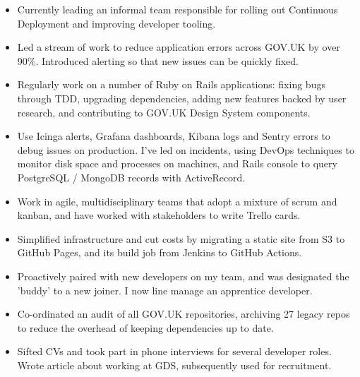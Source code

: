 \documentclass[10pt,a4paper,ragged2e,withhyper]{altacv}
\begin{document}
\begin{paracol}{2}



\begin{itemize}
    \item Currently leading an informal team responsible for rolling out Continuous Deployment and improving developer tooling.
\end{itemize}

\divider

\begin{itemize}
    \item Led a stream of work to reduce application errors across GOV.UK by over 90\%. Introduced alerting so that new issues can be quickly fixed.
    \item Regularly work on a number of Ruby on Rails applications: fixing bugs through TDD, upgrading dependencies, adding new features backed by user research, and contributing to GOV.UK Design System components.
    \item Use Icinga alerts, Grafana dashboards, Kibana logs and Sentry errors to debug issues on production. I've led on incidents, using DevOps techniques to monitor disk space and processes on machines, and Rails console to query PostgreSQL / MongoDB records with ActiveRecord.
    \item Work in agile, multidisciplinary teams that adopt a mixture of scrum and kanban, and have worked with stakeholders to write Trello cards.
    \item Simplified infrastructure and cut costs by migrating a static site from S3 to GitHub Pages, and its build job from Jenkins to GitHub Actions.
    \item Proactively paired with new developers on my team, and was designated the 'buddy' to a new joiner. I now line manage an apprentice developer.
    \item Co-ordinated an audit of all GOV.UK repositories, archiving 27 legacy repos to reduce the overhead of keeping dependencies up to date.
    \item Sifted CVs and took part in phone interviews for several developer roles. Wrote article about working at GDS, subsequently used for recruitment.
\end{itemize}


\end{paracol}
\end{document}
